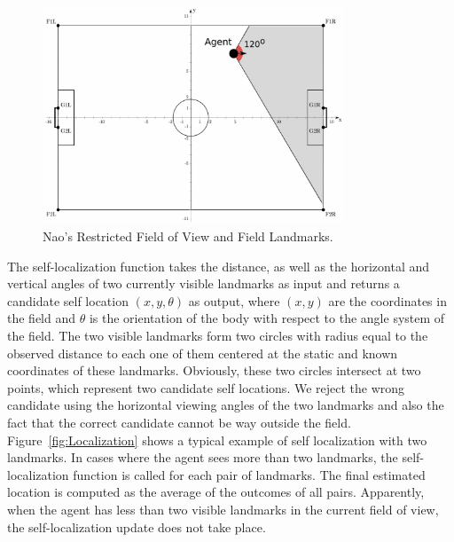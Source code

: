 \begin{figure}[t!]
\centering
  \includegraphics[width=0.8\textwidth]{Chapter3/figures/LViewAngle.pdf}
  \caption{Nao's Restricted Field of View and Field Landmarks.} 
  \label{fig:fieldofview}
\end{figure}

The self-localization function takes the distance, as well as the horizontal and vertical angles of two currently visible landmarks as input and returns a candidate self location $(x,y,\theta)$ as output, where $(x,y)$ are the coordinates in the field and $\theta$ is the orientation of the body with respect to the angle system of the field. The two visible landmarks form two circles with radius equal to the observed distance to each one of them centered at the static and known coordinates of these landmarks. Obviously, these two circles intersect at two points, which represent two candidate self locations. We reject the wrong candidate using the horizontal viewing angles of the two landmarks and also the fact that the correct candidate cannot be way outside the field. Figure~\ref{fig:Localization} shows a typical example of self localization with two landmarks. In cases where the agent sees more than two landmarks, the self-localization function is called for each pair of landmarks. The final estimated location is computed as the average of the outcomes of all pairs. Apparently, when the agent has less than two visible landmarks in the current field of view, the self-localization update does not take place.   


